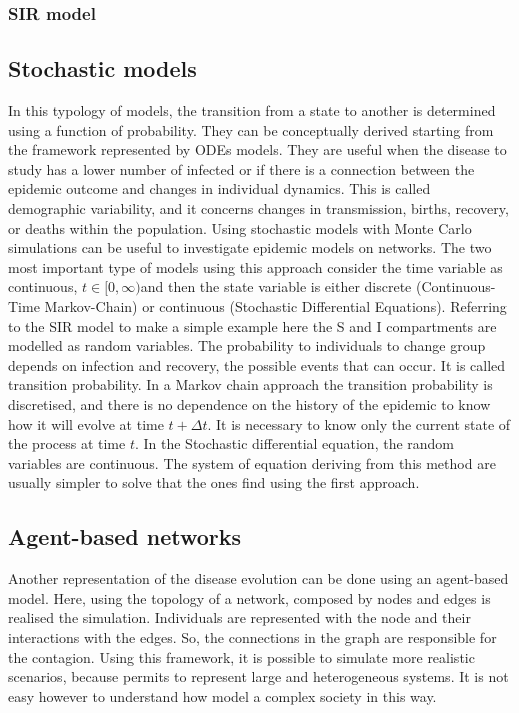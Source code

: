 \subsubsection{SIR model}

\subsection{Stochastic models}
In this typology of models, the transition from a state to another is determined using a function of probability. They can be conceptually derived starting from the framework represented by ODEs models. They are useful when the disease to study has a lower number of infected or if there is a connection between the epidemic outcome and changes in individual dynamics. This is called demographic variability, and it concerns changes in transmission, births, recovery, or deaths within the population. Using stochastic models with Monte Carlo simulations can be useful to investigate epidemic models on networks. 
The two most important type of models using this approach consider the time variable as continuous, $t \in [0, \infty) $and then the state variable is either discrete (Continuous-Time Markov-Chain) or continuous (Stochastic Differential Equations).
Referring to the SIR model to make a simple example here the S and I compartments are modelled as random variables. The probability to individuals to change group depends on infection and recovery, the possible events that can occur. It is called transition probability. 
In a Markov chain approach the transition probability is discretised, and there is no dependence on the history of the epidemic to know how it will evolve at time $t + \Delta t$. It is necessary to know only the current state of the process at time $t$. 
In the Stochastic differential equation, the random variables are continuous. The system of equation deriving from this method are usually simpler to solve that the ones find using the first approach\cite{Allen2017}.  

\subsection{Agent-based networks}
Another representation of the disease evolution can be done using an agent-based model. Here, using the topology of a network, composed by nodes and edges is realised the simulation. Individuals are represented with the node and their interactions with the edges. So, the connections in the graph are responsible for the contagion. Using this framework, it is possible to simulate more realistic scenarios, because permits to represent large and heterogeneous systems. It is not easy however to understand how model a complex society in this way.  

